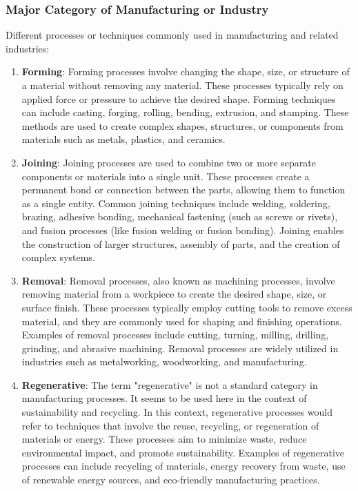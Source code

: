 \documentclass{article}
\begin{document}

\subsubsection*{Major Category of Manufacturing or Industry}
Different processes or techniques commonly used in manufacturing and related industries:
\begin{enumerate}[label=\alph*.]
  \item \textbf{Forming}: Forming processes involve changing the shape, size, or structure of a material without removing any material. These processes typically rely on applied force or pressure to achieve the desired shape. Forming techniques can include casting, forging, rolling, bending, extrusion, and stamping. These methods are used to create complex shapes, structures, or components from materials such as metals, plastics, and ceramics.
  \item \textbf{Joining}: Joining processes are used to combine two or more separate components or materials into a single unit. These processes create a permanent bond or connection between the parts, allowing them to function as a single entity. Common joining techniques include welding, soldering, brazing, adhesive bonding, mechanical fastening (such as screws or rivets), and fusion processes (like fusion welding or fusion bonding). Joining enables the construction of larger structures, assembly of parts, and the creation of complex systems.
  \item \textbf{Removal}: Removal processes, also known as machining processes, involve removing material from a workpiece to create the desired shape, size, or surface finish. These processes typically employ cutting tools to remove excess material, and they are commonly used for shaping and finishing operations. Examples of removal processes include cutting, turning, milling, drilling, grinding, and abrasive machining. Removal processes are widely utilized in industries such as metalworking, woodworking, and manufacturing.
  \item \textbf{Regenerative}: The term "regenerative" is not a standard category in manufacturing processes. It seems to be used here in the context of sustainability and recycling. In this context, regenerative processes would refer to techniques that involve the reuse, recycling, or regeneration of materials or energy. These processes aim to minimize waste, reduce environmental impact, and promote sustainability. Examples of regenerative processes can include recycling of materials, energy recovery from waste, use of renewable energy sources, and eco-friendly manufacturing practices.
\end{enumerate}
\end{document}
